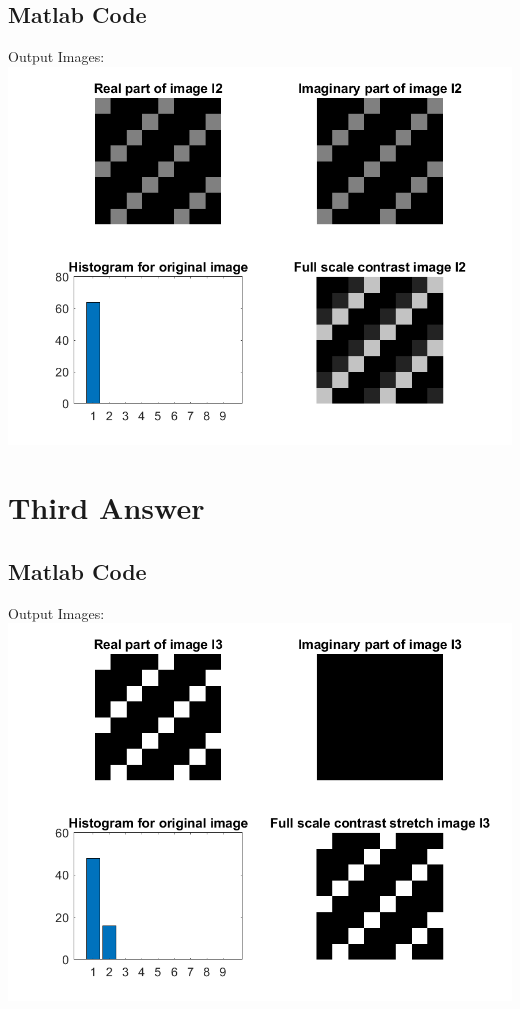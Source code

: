 \documentclass[11pt]{article} %
\begin{document}
\subsection*{Matlab Code}

Output Images: 
\includegraphics{Q2.png}

\section {Third Answer}
\subsection*{Matlab Code}

Output Images:
\includegraphics{Q3.png}
\end{document}
